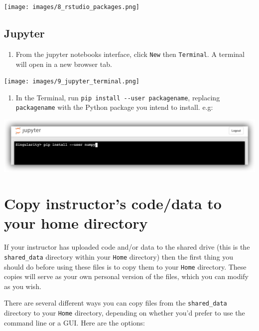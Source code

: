 \documentclass[]{book}
\providecommand{\tightlist}{%
  \setlength{\itemsep}{0pt}\setlength{\parskip}{0pt}}
\begin{document}
\texttt{[image: images/8\_rstudio\_packages.png]}

\hypertarget{jupyter-1}{%
\section{Jupyter}\label{jupyter-1}}

\begin{enumerate}
\def\labelenumi{\arabic{enumi}.}
\tightlist
\item
  From the jupyter notebooks interface, click \texttt{New} then \texttt{Terminal}. A terminal will open in a new browser tab.
\end{enumerate}

\texttt{[image: images/9\_jupyter\_terminal.png]}

\begin{enumerate}
\def\labelenumi{\arabic{enumi}.}
\setcounter{enumi}{1}
\tightlist
\item
  In the Terminal, run \texttt{pip\ install\ -\/-user\ packagename}, replacing \texttt{packagename} with the Python package you intend to install. e.g:
\end{enumerate}

\includegraphics{images/10_jupyter_terminal_install.png}

\hypertarget{copy-instructors-codedata-to-your-home-directory}{%
\chapter{Copy instructor's code/data to your home directory}\label{copy-instructors-codedata-to-your-home-directory}}

If your instructor has uploaded code and/or data to the shared drive (this is the \texttt{shared\_data} directory within your \texttt{Home} directory) then the first thing you should do before using these files is to copy them to your \texttt{Home} directory. These copies will serve as your own personal version of the files, which you can modify as you wish.

There are several different ways you can copy files from the \texttt{shared\_data} directory to your \texttt{Home} directory, depending on whether you'd prefer to use the command line or a GUI. Here are the options:
\end{document}
